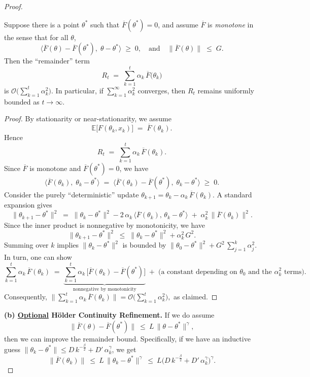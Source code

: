\begin{proof}
\smallskip
\noindent
\begin{lemma}
\label{lemma:monotonicity}
Suppose there is a point $\theta^*$ such that $\overline{F}(\theta^*) = 0$, and assume $\overline{F}$ is \emph{monotone} in the sense that for all $\theta$,
\[
  \bigl\langle
    \overline{F}(\theta) - \overline{F}(\theta^*),\;
    \theta - \theta^*
  \bigr\rangle
  \;\ge\; 0,
  \quad\text{and}\quad
  \|\overline{F}(\theta)\|\;\le\; G.
\]
Then the ``remainder'' term
\[
  R_t
  \;=\;
  \sum_{k=1}^t \alpha_k \,\overline{F}\bigl(\theta_k\bigr)
\]
is $\mathcal{O}\!\bigl(\sum_{k=1}^t \alpha_k^2\bigr)$. In particular, if $\sum_{k=1}^\infty \alpha_k^2$ converges, then $R_t$ remains uniformly bounded as $t \to \infty$.
\end{lemma}

\begin{proof}[Proof]
By stationarity or near-stationarity, we assume
\[
  \mathbb{E}\bigl[F(\theta_k,x_k)\bigr]
  \;=\;
  \overline{F}(\theta_k).
\]
Hence
\[
  R_t
  \;=\;
  \sum_{k=1}^t \alpha_k \,\overline{F}(\theta_k).
\]
Since $\overline{F}$ is monotone and $\overline{F}(\theta^*) = 0$, we have
\[
  \bigl\langle
    \overline{F}(\theta_k),\;
    \theta_k - \theta^*
  \bigr\rangle
  \;=\;
  \bigl\langle
    \overline{F}(\theta_k)
    - \overline{F}(\theta^*),\;
    \theta_k - \theta^*
  \bigr\rangle
  \;\ge\; 0.
\]
Consider the purely ``deterministic'' update $\theta_{k+1} = \theta_k - \alpha_k \,\overline{F}(\theta_k)$.  A standard expansion gives
\[
  \|\theta_{k+1} - \theta^*\|^2
  \;=\;
  \|\theta_k - \theta^*\|^2
  - 2\,\alpha_k\,\bigl\langle
        \overline{F}(\theta_k),\,
        \theta_k - \theta^*
      \bigr\rangle
  \;+\;
  \alpha_k^2 \,\|\overline{F}(\theta_k)\|^2.
\]
Since the inner product is nonnegative by monotonicity, we have
\[
  \|\theta_{k+1} - \theta^*\|^2
  \;\le\;
  \|\theta_k - \theta^*\|^2
  + \alpha_k^2\,G^2.
\]
Summing over $k$ implies
\(
  \|\theta_k - \theta^*\|^2
\)
is bounded by
\(
  \|\theta_0 - \theta^*\|^2 + G^2\,\sum_{j=1}^k \alpha_j^2.
\)
In turn, one can show
\[
  \sum_{k=1}^t \alpha_k\,\overline{F}(\theta_k)
  \;=\;
  \underbrace{
    \sum_{k=1}^t \alpha_k \,\bigl[\overline{F}(\theta_k) - \overline{F}(\theta^*)\bigr]
  }_{\text{nonnegative by monotonicity}}
  \;+\;
  \text{(a constant depending on $\theta_0$ and the $\alpha_k^2$ terms).}
\]
Consequently,
\(
  \bigl\|\sum_{k=1}^t \alpha_k\,\overline{F}(\theta_k)\bigr\|
  = \mathcal{O}\!\bigl(\sum_{k=1}^t \alpha_k^2\bigr),
\)
as claimed.
\end{proof}
\smallskip
\noindent
\textbf{(b) \underline{Optional} H\"older Continuity Refinement.}
If we do assume
\[
  \|\overline{F}(\theta) - \overline{F}(\theta^*)\|
  ~\le~
  L\,\|\theta-\theta^*\|^\gamma,
\]
then we can improve the remainder bound.  Specifically, if we have an inductive guess \(\|\theta_k-\theta^*\|\le D\,k^{-\tfrac{\beta}{2}}+D'\,\alpha_k^\gamma\), we get
\[
  \|\overline{F}(\theta_k)\|
  ~\le~
  L\,\|\theta_k-\theta^*\|^\gamma
  ~\le~
  L\bigl(D\,k^{-\tfrac{\beta}{2}}+D'\,\alpha_k^\gamma\bigr)^\gamma.
\]

\end{proof}
